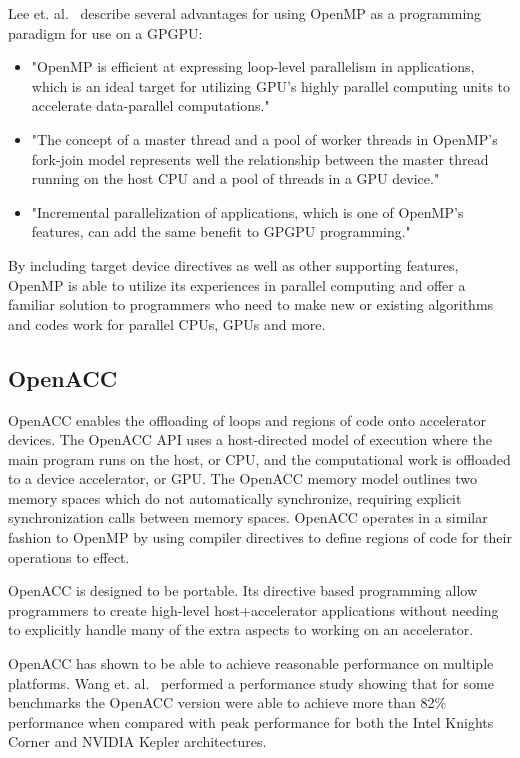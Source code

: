 Lee et. al.~\cite{lee2009openmp} describe several advantages for using OpenMP as a programming paradigm for use on a GPGPU:
\begin{itemize}
\item "OpenMP is efficient at expressing loop-level parallelism in applications, which is an ideal target for utilizing GPU's highly parallel computing units to accelerate data-parallel computations."
\item "The concept of a master thread and a pool of worker threads in OpenMP's fork-join model represents well the relationship between the master thread running on the host CPU and a pool of threads in a GPU device."
\item "Incremental parallelization of applications, which is one of OpenMP's features, can add the same benefit to GPGPU programming."~\cite{lee2009openmp}
\end{itemize}

By including target device directives as well as other supporting features, OpenMP is able to utilize its experiences in parallel computing and offer a familiar solution to programmers who need to make new or existing algorithms and codes work for parallel CPUs, GPUs and more.
\cite{ayguade2010extending}

\subsection*{\textbf{OpenACC}}

OpenACC enables the offloading of loops and regions of code onto accelerator devices.
%
The OpenACC API uses a host-directed model of execution where the main program runs on the host, or CPU, and the computational work is offloaded to a device accelerator, or GPU.
%
The OpenACC memory model outlines two memory spaces which do not automatically synchronize, requiring explicit synchronization calls between memory spaces.
%
OpenACC operates in a similar fashion to OpenMP by using compiler directives to define regions of code for their operations to effect.
\cite{wienke2012openacc}

OpenACC is designed to be portable.
%
Its directive based programming allow programmers to create high-level host+accelerator applications without needing to explicitly handle many of the extra aspects to working on an accelerator.
\cite{openacc}

OpenACC has shown to be able to achieve reasonable performance on multiple platforms.
%
Wang et. al.~\cite{wang2013performance} performed a performance study showing that for some benchmarks the OpenACC version were able to achieve more than 82\% performance when compared with peak performance for both the Intel Knights Corner and NVIDIA Kepler architectures.

